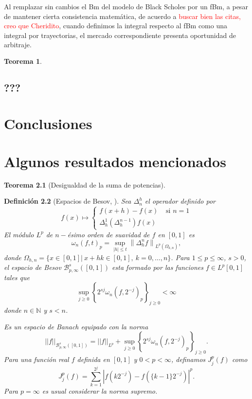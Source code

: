 \documentclass[letterpaper,12pt,oneside]{book}
\makeatletter
\renewcommand*{\cleardoublepage}{\clearpage\if@twoside \ifodd\c@page\else
\hbox{}%
\thispagestyle{empty}%
\newpage%
\if@twocolumn\hbox{}\newpage\fi\fi\fi}
\theoremstyle{plain}
\newtheorem{theorem}{Teorema}[section]
\newtheorem{dfn}[theorem]{Definición}
\numberwithin{theorem}{section}
\makeatother
\begin{document}
Al remplazar sin cambios el Bm del modelo de Black Scholes por un fBm, a pesar de mantener cierta consistencia matemática, de acuerdo a \textcolor{red}{buscar bien las citas, creo que Cheridito}, cuando definimos la integral respecto al fBm como una integral por trayectorias, el mercado correspondiente presenta oportunidad de arbitraje.
\begin{theorem}
\end{theorem}
\section{???}\label{sec3.1}

\chapter*{Conclusiones}  

\appendix
\cleardoublepage
\addappheadtotoc\appendixpage
\chapter{Algunos resultados mencionados}\label{anx:A}
\begin{theorem}[Desigualdad de la suma de potencias]
\end{theorem}
\begin{dfn}[Espacios de Besov, \cite{rosenbaum_new_2011}]
	Sea $\Delta^h_n$ el operador definido por
	$$f(x)\mapsto\left\{\begin{matrix}f(x+h)-f(x)&\text{ si }n=1 \\
	\Delta^1_h(\Delta^{n-1}_h)f(x)\end{matrix}\right.$$
	El módulo $L^p$ de $n-$ésimo orden de suavidad de $f$ en $[0, 1]$ es
	$$\omega_{n}(f, t)_{p}=\sup _{|h| \leq t}\left\|\Delta_{h}^{n} f\right\|_{L^{p}\left(\Omega_{k, n}\right)},$$
	donde $\Omega_{h,n}=\{x\in[0,1]|\:x+hk\in[0,1],\: k=0,\ldots,n\}$. Para $1\leq p\leq \infty$, $s>0$, el espacio de Besov $\mathcal{B}_{p, \infty}^s([0,1])$ esta formado por las funciones $f\in L^p[0,1]$ tales que
	$$\sup_{j\geq 0}\left\{2^{sj}\omega_n(f,2^{-j})_p\right\}_{j\geq 0}<\infty$$
	donde $n\in\mathbb N$ y $s<n$.
	
	Es un espacio de Banach equipado con la norma
	$$||f||_{\mathcal{B}_{p, \infty}^s([0,1])}=||f||_{L^p}+\sup_{j\geq 0}\left\{2^{sj}\omega_n(f,2^{-j})_p\right\}_{j\geq 0}.$$
	Para una función real $f$ definida en $[0,1]$ y $0<p<\infty$, definamos $J^p_j(f)$ como
	$$J^p_j(f)=\sum_{k=1}^{2^j}\left|f(k2^{-j})-f(\{k-1\}2^{-j})\right|^p.$$
	Para $p=\infty$ es usual considerar la norma supremo.
\end{dfn}
\end{document}
